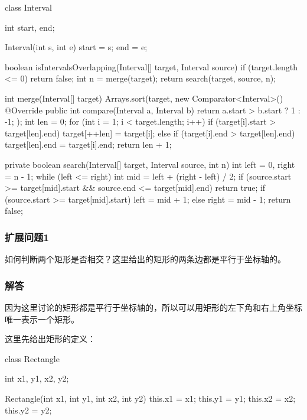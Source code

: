 \begin{Codex}[label={[$O(nlgn)+O(1)$]Chap02_19_IntervalsOverlapping.java}]
class Interval {
	int start, end;
	
	Interval(int s, int e) {
		start = s;
		end = e;
	}
}

boolean isIntervalsOverlapping(Interval[] target, Interval source) {
	if (target.length <= 0) {
		return false;
	}
	int n = merge(target);
	return search(target, source, n);
}

int merge(Interval[] target) {
	Arrays.sort(target, new Comparator<Interval>() {
		@Override
		public int compare(Interval a, Interval b) {
			return a.start > b.start ? 1 : -1;
		}
	});
	int len = 0;
	for (int i = 1; i < target.length; i++) {
		if (target[i].start > target[len].end) {
			target[++len] = target[i];
		} else if (target[i].end > target[len].end) {
		target[len].end = target[i].end;
	}
}
return len + 1;
}

private boolean search(Interval[] target, Interval source, int n) {
	int left = 0, right = n - 1;
	while (left <= right) {
		int mid = left + (right - left) / 2;
		if (source.start >= target[mid].start && source.end <= target[mid].end) {
			return true;
		}
		if (source.start >= target[mid].start) {
			left = mid + 1;
		} else {
		right = mid - 1;
	}
}
return false;
}
\end{Codex}

\subsubsection{扩展问题1}
如何判断两个矩形是否相交？这里给出的矩形的两条边都是平行于坐标轴的。

\subsubsection{解答}
因为这里讨论的矩形都是平行于坐标轴的，所以可以用矩形的左下角和右上角坐标唯一表示一个矩形。
\begin{center}
	\label{fig:rectangle-overlapping-1}
\end{center}

这里先给出矩形的定义：
\begin{Codex}[label={Rectangle.java}]
class Rectangle {
	int x1, y1, x2, y2;
	
	Rectangle(int x1, int y1, int x2, int y2) {
		this.x1 = x1;
		this.y1 = y1;
		this.x2 = x2;
		this.y2 = y2;
	}
}
\end{Codex}

